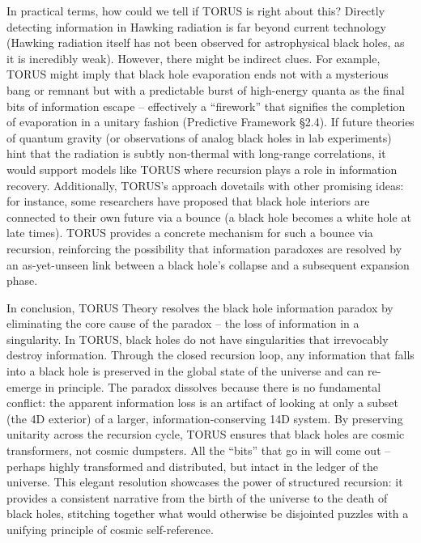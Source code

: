 \documentclass[
]{article}
\begin{document}
In practical terms, how could we tell if TORUS is right about this?
Directly detecting information in Hawking radiation is far beyond
current technology (Hawking radiation itself has not been observed for
astrophysical black holes, as it is incredibly weak). However, there
might be indirect clues. For example, TORUS might imply that black hole
evaporation ends not with a mysterious bang or remnant but with a
predictable burst of high-energy quanta as the final bits of information
escape -- effectively a ``firework'' that signifies the completion of
evaporation in a unitary fashion (Predictive Framework §2.4). If future
theories of quantum gravity (or observations of analog black holes in
lab experiments) hint that the radiation is subtly non-thermal with
long-range correlations, it would support models like TORUS where
recursion plays a role in information recovery. Additionally, TORUS's
approach dovetails with other promising ideas: for instance, some
researchers have proposed that black hole interiors are connected to
their own future via a bounce (a black hole becomes a white hole at late
times). TORUS provides a concrete mechanism for such a bounce via
recursion, reinforcing the possibility that information paradoxes are
resolved by an as-yet-unseen link between a black hole's collapse and a
subsequent expansion phase.

In conclusion, TORUS Theory resolves the black hole information paradox
by eliminating the core cause of the paradox -- the loss of information
in a singularity. In TORUS, black holes do not have singularities that
irrevocably destroy information. Through the closed recursion loop, any
information that falls into a black hole is preserved in the global
state of the universe and can re-emerge in principle. The paradox
dissolves because there is no fundamental conflict: the apparent
information loss is an artifact of looking at only a subset (the 4D
exterior) of a larger, information-conserving 14D system. By preserving
unitarity across the recursion cycle, TORUS ensures that black holes are
cosmic transformers, not cosmic dumpsters. All the ``bits'' that go in
will come out -- perhaps highly transformed and distributed, but intact
in the ledger of the universe. This elegant resolution showcases the
power of structured recursion: it provides a consistent narrative from
the birth of the universe to the death of black holes, stitching
together what would otherwise be disjointed puzzles with a unifying
principle of cosmic self-reference.
\end{document}
